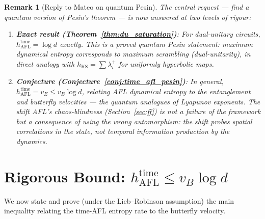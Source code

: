 \documentclass[12pt,a4paper]{article}
\newtheorem{remark}[theorem]{Remark}
\begin{document}
\begin{remark}[Reply to Mateo on quantum Pesin]
The central request --- find a quantum version of Pesin's theorem --- is now
answered at two levels of rigour:
\begin{enumerate}
\item \textbf{Exact result (Theorem~\ref{thm:du_saturation})}: For dual-unitary
circuits, $h_{\mathrm{AFL}}^{\mathrm{time}}=\log d$ \emph{exactly}.  This is a
proved quantum Pesin statement: maximum dynamical entropy corresponds to maximum
scrambling (dual-unitarity), in direct analogy with $h_{\mathrm{KS}}=\sum\lambda_i^+$
for uniformly hyperbolic maps.
\item \textbf{Conjecture (Conjecture~\ref{conj:time_afl_pesin})}: In general,
$h_{\mathrm{AFL}}^{\mathrm{time}}=v_E\leq v_B\log d$, relating AFL dynamical
entropy to the entanglement and butterfly velocities --- the quantum analogues
of Lyapunov exponents.  The shift AFL's chaos-blindness (Section~\ref{sec:ff})
is not a failure of the framework but a consequence of using the \emph{wrong}
automorphism: the shift probes spatial correlations in the state, not temporal
information production by the dynamics.
\end{enumerate}
\end{remark}

\section{Rigorous Bound: \texorpdfstring{$h_{\mathrm{AFL}}^{\mathrm{time}} \leq v_B\log d$}{h<=vB log d}}
\label{sec:pesin_bound}

We now state and prove (under the Lieb--Robinson assumption) the main inequality
relating the time-AFL entropy rate to the butterfly velocity.
\end{document}
